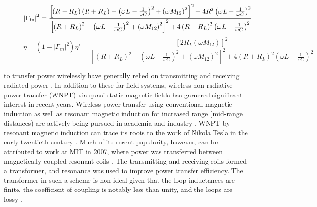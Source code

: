 \documentclass[journal]{IEEEtran}
\begin{document}
\setcounter{equation}{5}

\begin{figure*}[b!]
\normalsize
\hrulefill
\begin{equation}
\left|\Gamma_{\mathrm{in}}\right|^2 =  \frac{\left[\left(R-R_L\right) \left(R+R_L\right) - \left(\omega L - \frac{1}{\omega C}\right)^2 + \left(\omega M_{12}\right)^2 \right]^2 + 4 R^2 \left(\omega L - \frac{1}{\omega C}\right)^2}
 {\left[\left(R+R_L\right)^2 - \left(\omega L - \frac{1}{\omega C}\right)^2 + \left(\omega M_{12}\right)^2 \right]^2 + 4 \left(R+R_L\right)^2 \left(\omega L - \frac{1}{\omega C}\right)^2}
\label{eq:ReflPower} \\
\end{equation}
\begin{equation}
\eta = \left(1-\left|\Gamma_{in}\right|^2\right) \eta' = \frac{\left[2 R_L \left(\omega M_{12}\right)\right]^2}{\left[\left(R+R_L\right)^2 - \left(\omega L - \frac{1}{\omega C}\right)^2 + \left(\omega M_{12}\right)^2\right]^2 + 4\left(R+R_L\right)^2\left(\omega L - \frac{1}{\omega C}\right)^2}
\label{eq:EffwRefl}
\end{equation}
\vspace*{4pt}
\end{figure*}

\setcounter{equation}{\value{tempequationcounter}}

 to transfer power wirelessly have generally relied on transmitting and receiving radiated power \cite{PowerHistory, LowPowerFarField}. In addition to these far-field systems, wireless non-radiative power transfer (WNPT) via quasi-static magnetic fields has garnered significant interest in recent years. Wireless power transfer using conventional magnetic induction as well as resonant magnetic induction for increased range (mid-range distances) are actively being pursued in academia and industry \cite{eCoupled, WPC, A4WP, PMA, InductivePowerTransfer, Coil4ConsumerElec}. WNPT by resonant magnetic induction can trace its roots to the work of Nikola Tesla in the early twentieth century \cite{Tesla-Patent1,Tesla-Patent2,SecorArticle}. Much of its recent popularity, however, can be attributed to work at MIT in 2007, where power was transferred between magnetically-coupled resonant coils \cite{Soljacic}.  The transmitting and receiving coils formed a transformer, and resonance was used to improve power transfer efficiency.  The transformer in such a scheme is non-ideal given that the loop inductances are finite, the coefficient of coupling is notably less than unity, and the loops are lossy \cite{Everitt}.
\end{document}
